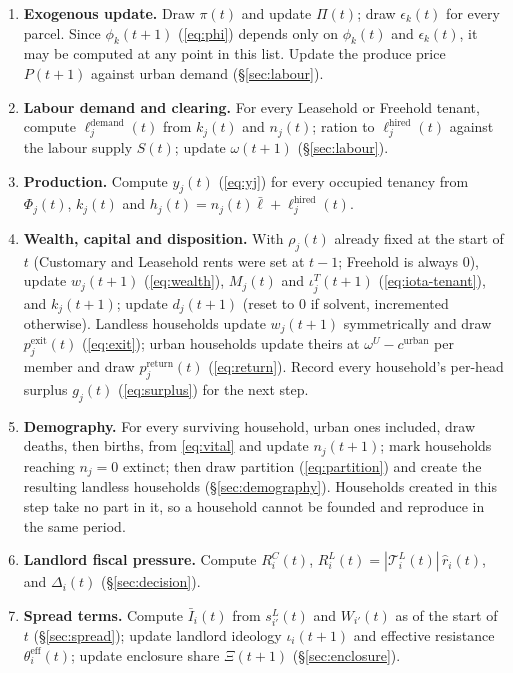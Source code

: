 \documentclass[11pt,english]{article}
\begin{document}
\begin{enumerate}
\item \textbf{Exogenous update.} Draw $\pi(t)$ and update $\Pi(t)$; draw $\epsilon_k(t)$ for every parcel. Since $\phi_k(t+1)$ (\eqref{eq:phi}) depends only on $\phi_k(t)$ and $\epsilon_k(t)$, it may be computed at any point in this list. Update the produce price $P(t+1)$ against urban demand (\S\ref{sec:labour}).
\item \textbf{Labour demand and clearing.} For every Leasehold or Freehold tenant, compute $\ell_j^{\text{demand}}(t)$ from $k_j(t)$ and $n_j(t)$; ration to $\ell_j^{\text{hired}}(t)$ against the labour supply $S(t)$; update $\omega(t+1)$ (\S\ref{sec:labour}).
\item \textbf{Production.} Compute $y_j(t)$ (\eqref{eq:yj}) for every occupied tenancy from $\Phi_j(t)$, $k_j(t)$ and $h_j(t)=n_j(t)\bar\ell+\ell_j^{\text{hired}}(t)$.
\item \textbf{Wealth, capital and disposition.} With $\rho_j(t)$ already fixed at the start of $t$ (Customary and Leasehold rents were set at $t-1$; Freehold is always $0$), update $w_j(t+1)$ (\eqref{eq:wealth}), $M_j(t)$ and $\iota_j^{T}(t+1)$ (\eqref{eq:iota-tenant}), and $k_j(t+1)$; update $d_j(t+1)$ (reset to $0$ if solvent, incremented otherwise). Landless households update $w_j(t+1)$ symmetrically and draw $p_j^{\text{exit}}(t)$ (\eqref{eq:exit}); urban households update theirs at $\omega^{U}-c^{\text{urban}}$ per member and draw $p_j^{\text{return}}(t)$ (\eqref{eq:return}). Record every household's per-head surplus $g_j(t)$ (\eqref{eq:surplus}) for the next step.
\item \textbf{Demography.} For every surviving household, urban ones included, draw deaths, then births, from \eqref{eq:vital} and update $n_j(t+1)$; mark households reaching $n_j=0$ extinct; then draw partition (\eqref{eq:partition}) and create the resulting landless households (\S\ref{sec:demography}). Households created in this step take no part in it, so a household cannot be founded and reproduce in the same period.
\item \textbf{Landlord fiscal pressure.} Compute $R_i^{C}(t)$, $R_i^{L}(t)=|\mathcal{T}_i^{L}(t)|\,\hat r_i(t)$, and $\Delta_i(t)$ (\S\ref{sec:decision}).
\item \textbf{Spread terms.} Compute $\bar I_i(t)$ from $s_{i'}^{L}(t)$ and $W_{i'}(t)$ as of the start of $t$ (\S\ref{sec:spread}); update landlord ideology $\iota_i(t+1)$ and effective resistance $\theta_i^{\text{eff}}(t)$; update enclosure share $\Xi(t+1)$ (\S\ref{sec:enclosure}).

\end{enumerate}
\end{document}

